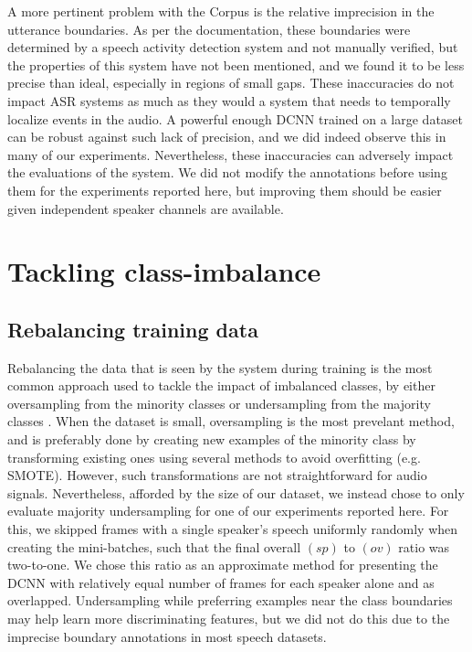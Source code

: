 \documentclass[a4paper]{article}
\begin{document}
A more pertinent problem with the Corpus is the relative imprecision in the utterance boundaries.
As per the documentation,
these boundaries were determined by a speech activity detection system and not manually verified,
but the properties of this system have not been mentioned,
and we found it to be less precise than ideal, especially in regions of small gaps.
These inaccuracies do not impact ASR systems as much as they would a system that needs to temporally localize events in the audio.
A powerful enough DCNN trained on a large dataset can be robust against such lack of precision,
and we did indeed observe this in many of our experiments.
Nevertheless, these inaccuracies can adversely impact the evaluations of the system.
We did not modify the annotations before using them for the experiments reported here,
but improving them should be easier given independent speaker channels are available.

\section{Tackling class-imbalance} \label{sec:imbalance}
\subsection{Rebalancing training data}
Rebalancing the data that is seen by the system during training is the most common approach used to tackle the impact of imbalanced classes,
by either oversampling from the minority classes or undersampling from the majority classes
\cite{wang_training_2016,Budasystematicstudyclass2017}.
When the dataset is small, oversampling is the most prevelant method,
and is preferably done by creating new examples of the minority class by transforming existing ones using several methods to avoid overfitting (e.g. SMOTE).
However, such transformations are not straightforward for audio signals.
Nevertheless, afforded by the size of our dataset,
we instead chose to only evaluate majority undersampling for one of our experiments reported here.
For this, we skipped frames with a single speaker's speech uniformly randomly when creating the mini-batches,
such that the final overall $(sp)$ to $(ov)$ ratio was two-to-one.
We chose this ratio as an approximate method for presenting the DCNN with relatively equal number of frames for each speaker alone and as overlapped.
Undersampling while preferring examples near the class boundaries may help learn more discriminating features,
but we did not do this due to the imprecise boundary annotations in most speech datasets.
\end{document}
